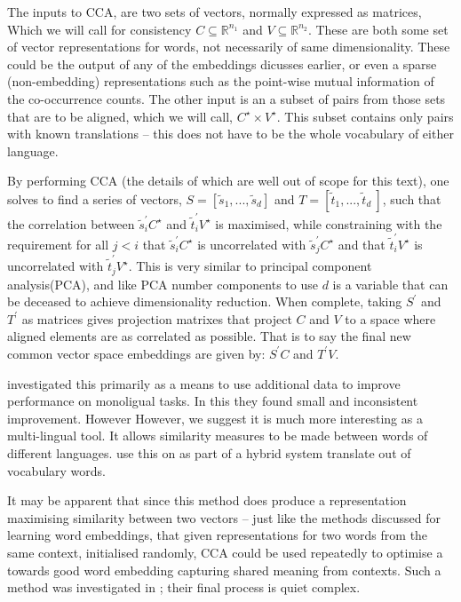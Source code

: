 \documentclass[parskip]{komatufte}
\begin{document}
The inputs to CCA, are two sets of vectors, normally expressed as matrices,
Which we will call for consistency $C \subseteq \mathbb{R}^{n_1}$ and $V \subseteq \mathbb{R}^{n_2}$.
These are both some set of vector representations for words, not necessarily of same dimensionality.
These could be the output of any of the embeddings dicusses earlier,
or even a sparse (non-embedding) representations such as the point-wise mutual information of the co-occurrence counts.
The other input is an a subset of pairs from those sets that are to be aligned, which we will call, $C^\star \times V^\star$.
This subset contains only pairs with known translations -- this does not have to be the whole vocabulary of either language.


%
By performing CCA (the details of which are well out of scope for this text),
one solves to find a series of vectors, $S=\left[ \tilde{s}_1, ..., \tilde{s}_d \right]$ and $T= \left[ \tilde{t}_1, ..., \tilde{t}_d\ \right]$,
such that the correlation between $\tilde{s}_i^\prime C^\star$ and $\tilde{t}_i^\prime V^\star$ is maximised,
while constraining with the requirement for all $j<i$ that $\tilde{s}_i^\prime C^\star$ is uncorrelated with $\tilde{s}_j^\prime C^\star$  and that  $\tilde{t}_i^\prime V^\star$ is uncorrelated with $\tilde{t}_j^\prime V^\star$.
This is very similar to principal component analysis(PCA), and like PCA number components to use $d$ is a variable that can be deceased to achieve dimensionality reduction.
When complete, taking $S^\prime$ and $T^\prime$ as matrices gives projection matrixes that project $C$ and $V$ to a space where aligned elements are as correlated as possible.
That is to say the final new common vector space embeddings are given by:
$S^\prime C$ and $T^\prime V$.

\textcite{faruqui2014improving} investigated this primarily as a means to use additional data to improve performance on monoligual tasks.
In this they found small and inconsistent improvement.
However
However, we suggest it is much more interesting as a multi-lingual tool.
It allows similarity measures to be made between words of different languages.
 use this on as part of a hybrid system translate out of vocabulary words.






It may be apparent that since this method does produce a representation maximising similarity between two vectors -- just like the methods discussed for learning word embeddings,
that given representations for two words from the same context, initialised randomly,
CCA could be used repeatedly to optimise a towards good word embedding capturing shared meaning from contexts.
Such a method was investigated in ; their final process is quiet complex.
\end{document}
